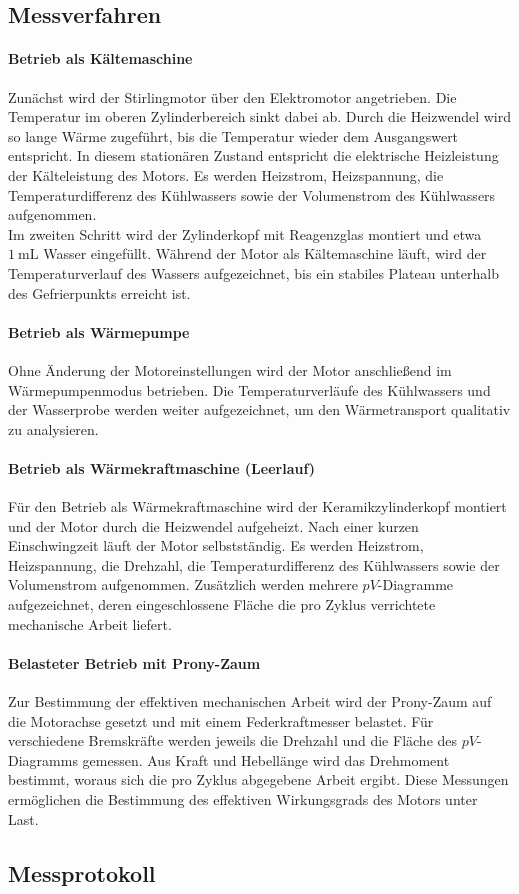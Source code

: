 \subsection{Messverfahren}\label{sec:Messverfahren}
\paragraph{Betrieb als Kältemaschine}
Zunächst wird der Stirlingmotor über den Elektromotor angetrieben. Die Temperatur im oberen Zylinderbereich sinkt dabei ab. Durch die Heizwendel wird so lange Wärme zugeführt, bis die Temperatur wieder dem Ausgangswert entspricht. In diesem stationären Zustand entspricht die elektrische Heizleistung der Kälteleistung des Motors. Es werden Heizstrom, Heizspannung, die Temperaturdifferenz des Kühlwassers sowie der Volumenstrom des Kühlwassers aufgenommen.\\
Im zweiten Schritt wird der Zylinderkopf mit Reagenzglas montiert und etwa \(\qty{1}{\milli\liter}\) Wasser eingefüllt. Während der Motor als Kältemaschine läuft, wird der Temperaturverlauf des Wassers aufgezeichnet, bis ein stabiles Plateau unterhalb des Gefrierpunkts erreicht ist. 

\paragraph{Betrieb als Wärmepumpe}
Ohne Änderung der Motoreinstellungen wird der Motor anschließend im Wärmepumpenmodus betrieben. Die Temperaturverläufe des Kühlwassers und der Wasserprobe werden weiter aufgezeichnet, um den Wärmetransport qualitativ zu analysieren.

\paragraph{Betrieb als Wärmekraftmaschine (Leerlauf)}
Für den Betrieb als Wärmekraftmaschine wird der Keramikzylinderkopf montiert und der Motor durch die Heizwendel aufgeheizt. Nach einer kurzen Einschwingzeit läuft der Motor selbstständig. Es werden Heizstrom, Heizspannung, die Drehzahl, die Temperaturdifferenz des Kühlwassers sowie der Volumenstrom aufgenommen. Zusätzlich werden mehrere \(pV\)-Diagramme aufgezeichnet, deren eingeschlossene Fläche die pro Zyklus verrichtete mechanische Arbeit liefert.

\paragraph{Belasteter Betrieb mit Prony-Zaum}
Zur Bestimmung der effektiven mechanischen Arbeit wird der Prony-Zaum auf die Motorachse gesetzt und mit einem Federkraftmesser belastet. Für verschiedene Bremskräfte werden jeweils die Drehzahl und die Fläche des \(pV\)-Diagramms gemessen. Aus Kraft und Hebellänge wird das Drehmoment bestimmt, woraus sich die pro Zyklus abgegebene Arbeit ergibt. Diese Messungen ermöglichen die Bestimmung des effektiven Wirkungsgrads des Motors unter Last.

\subsection{Messprotokoll}

